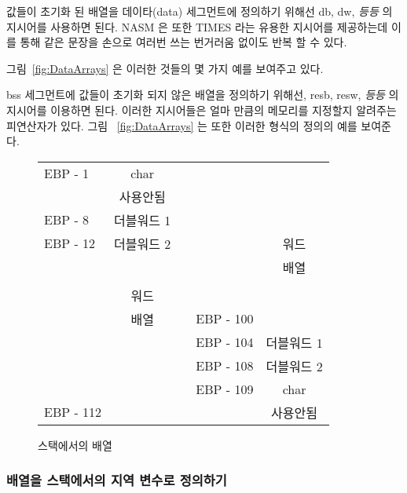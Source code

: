 값들이 초기화 된 배열을 데이타{\code (data)} 세그먼트에 정의하기 위해선 {\code db}, 
{\code dw}, \emph{등등} 의 지시어를 사용하면 된다.  NASM 은 또한
{\code TIMES}  라는 유용한 지시어를 제공하는데 이를 통해 같은 문장을 
손으로 여러번 쓰는 번거러움 없이도 반복 할 수 있다. 

그림~\ref{fig:DataArrays} 은 이러한 것들의 몇 가지 예를 보여주고 있다.

{\code bss} 세그먼트에 값들이 초기화 되지 않은 배열을 정의하기 위해선, {\code resb}, 
{\code resw}, \emph{등등} 의 지시어를 이용하면 된다.  
이러한 지시어들은 얼마 만큼의 메모리를 지정할지 알려주는 피연산자가 있다. 그림
~\ref{fig:DataArrays} 는 또한 이러한 형식의 정의의 예를 보여준다. 

\begin{figure}[t]
\centering
\begin{tabular}{l|c|ll|c|}
\cline{2-2} \cline{5-5}
EBP - 1  & char    & \hspace{2em} &           & \\
\cline{2-2}
         & 사용안됨  &              &           & \\
\cline{2-2}
EBP - 8  & 더블워드 1 &              &           & \\
\cline{2-2}
EBP - 12 & 더블워드 2 &              &           & 워드 \\
\cline{2-2}
         &         &              &           & 배열\\
         &         &              &           & \\
         & 워드    &              &           & \\
         & 배열   &              & EBP - 100 & \\
\cline{5-5}
         &         &              & EBP - 104 & 더블워드 1 \\
\cline{5-5}
         &         &              & EBP - 108 & 더블워드 2 \\
\cline{5-5}
         &         &              & EBP - 109 & char \\
\cline{5-5}
EBP - 112 &        &              &           & 사용안됨 \\
\cline{2-2} \cline{5-5}
\end{tabular}
\caption{스택에서의 배열 \label{fig:StackLayouts}}
\end{figure}

\subsubsection{배열을 스택에서의 지역 변수로 정의하기}

